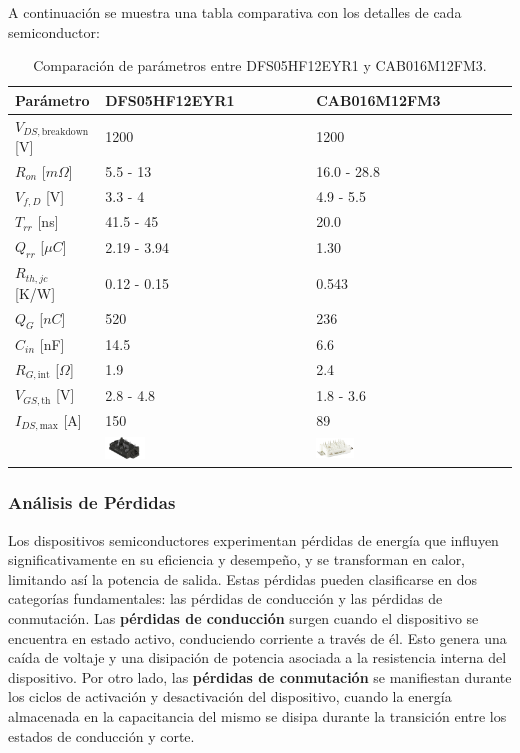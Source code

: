 A continuación se muestra una tabla comparativa con los detalles de cada semiconductor:
\begin{table}[H]
	\centering
	\begin{tabular}{|l|l|l|}
		\hline
		\textbf{Parámetro} & \textbf{DFS05HF12EYR1} & \textbf{CAB016M12FM3} \\ \hline
		\(V_{DS,\text{breakdown}}\) [V] & 1200 & 1200 \\ \hline
		\(R_{on}\) [\(m \Omega\)] & 5.5 - 13 & 16.0 - 28.8 \\ \hline
		\(V_{f,D}\) [V] & 3.3 - 4 & 4.9 - 5.5 \\ \hline
		\(T_{rr}\) [ns] & 41.5 - 45 & 20.0 \\ \hline
		\(Q_{rr}\) [\(\mu C\)] & 2.19 - 3.94 & 1.30 \\ \hline
		\(R_{th,jc}\) [K/W] & 0.12 - 0.15 & 0.543 \\ \hline
		\(Q_{G}\) [\(nC\)] & 520 & 236 \\ \hline
		\(C_{in}\) [nF] & 14.5 & 6.6 \\ \hline
		\(R_{G,\text{int}}\) [\(\Omega\)] & 1.9 & 2.4 \\ \hline
		\(V_{GS,\text{th}}\) [V] & 2.8 - 4.8 & 1.8 - 3.6 \\ \hline
		\(I_{DS,\text{max}}\) [A] & 150 & 89 \\ \hline
		& \includegraphics[width=0.2\textwidth]{fig/DFS05.png} & \includegraphics[width=0.2\textwidth]{fig/CAB016.png} \\
		\hline
	\end{tabular}
	\caption{Comparación de parámetros entre DFS05HF12EYR1 y CAB016M12FM3.}
\end{table}


\subsubsection{Análisis de Pérdidas}

Los dispositivos semiconductores experimentan pérdidas de energía que influyen significativamente en su eficiencia y desempeño, y se transforman en calor, limitando así la potencia de salida. Estas pérdidas pueden clasificarse en dos categorías fundamentales: las pérdidas de conducción y las pérdidas de conmutación. Las \textbf{pérdidas de conducción} surgen cuando el dispositivo se encuentra en estado activo, conduciendo corriente a través de él. Esto genera una caída de voltaje y una disipación de potencia asociada a la resistencia interna del dispositivo. Por otro lado, las \textbf{pérdidas de conmutación} se manifiestan durante los ciclos de activación y desactivación del dispositivo, cuando la energía almacenada en la capacitancia del mismo se disipa durante la transición entre los estados de conducción y corte.

